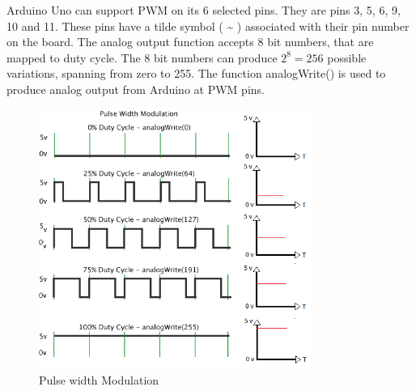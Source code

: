 \par Arduino Uno can support \ac{PWM} on its 6 selected pins. They are pins 3, 5, 6, 9, 10 and 11. These pins have a tilde symbol ( \textasciitilde{} ) associated with their pin number on the board. The analog output function accepts 8 bit numbers, that are mapped to duty cycle. The 8 bit numbers can produce $2^8=256$ possible variations, spanning from zero to 255. The function analogWrite() is used to  produce analog output from Arduino at \ac{PWM} pins.

\begin{figure}
 \centering 
 \includegraphics[width=3.5in]{Images/Intro_Arduino/pwm.png}
 \caption{Pulse width Modulation}
\end{figure}

\renewcommand{\arraystretch}{1.2}
\begin{table}
	\raggedright
    \caption{ADC v/s PWM}
\end{table}
\renewcommand{\arraystretch}{1}

